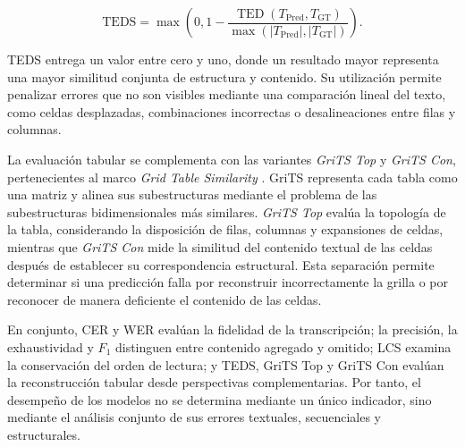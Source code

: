 \begin{equation}
    \mathrm{TEDS}
    =
    \max\left(
        0,
        1-
        \frac{
            \operatorname{TED}(T_{\mathrm{Pred}},T_{\mathrm{GT}})
        }{
            \max\left(
                |T_{\mathrm{Pred}}|,
                |T_{\mathrm{GT}}|
            \right)
        }
    \right).
    \label{eq:teds}
\end{equation}

TEDS entrega un valor entre cero y uno, donde un resultado mayor representa una mayor similitud conjunta de estructura y contenido. Su utilización permite penalizar errores que no son visibles mediante una comparación lineal del texto, como celdas desplazadas, combinaciones incorrectas o desalineaciones entre filas y columnas.

La evaluación tabular se complementa con las variantes \textit{GriTS Top} y \textit{GriTS Con}, pertenecientes al marco \textit{Grid Table Similarity} \cite{smock2023grits}. GriTS representa cada tabla como una matriz y alinea sus subestructuras mediante el problema de las subestructuras bidimensionales más similares. \textit{GriTS Top} evalúa la topología de la tabla, considerando la disposición de filas, columnas y expansiones de celdas, mientras que \textit{GriTS Con} mide la similitud del contenido textual de las celdas después de establecer su correspondencia estructural. Esta separación permite determinar si una predicción falla por reconstruir incorrectamente la grilla o por reconocer de manera deficiente el contenido de las celdas.

En conjunto, CER y WER evalúan la fidelidad de la transcripción; la precisión, la exhaustividad y $F_1$ distinguen entre contenido agregado y omitido; LCS examina la conservación del orden de lectura; y TEDS, GriTS Top y GriTS Con evalúan la reconstrucción tabular desde perspectivas complementarias. Por tanto, el desempeño de los modelos no se determina mediante un único indicador, sino mediante el análisis conjunto de sus errores textuales, secuenciales y estructurales.
